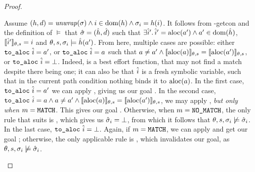 \begin{proof}
\begin{hypvlist}
 Assume $(h,d)={\operatorname{\mathit{unwrap}}}(\sigma) \land i\in\operatorname{dom}(h) \land \sigma_{i}=h(i)$.
 It follows from \hyp{getcon} and the definition of $\models$ that $\hat{\sigma}=(\hat{h}, \hat{d})$ such that $\exists \hat{i}'\ldotp \hat{i}' = \text{aloc}(a') \land a' \in \operatorname{dom}(\hat{h})$, $\llbracket\hat{i}'\rrbracket_{\theta,s}=i$ and $\theta,s,\sigma_i\models \hat{h}(a')$.
 From here, multiple cases are possible: either $\texttt{to\_aloc}~\hat{i}=a'$, or $\texttt{to\_aloc}~\hat{i}=a$ such that $a\neq a'\land \llbracket\text{aloc}(a)\rrbracket_{\theta,s}=\llbracket\text{aloc}(a')\rrbracket_{\theta,s}$, or $\texttt{to\_aloc}~\hat{i}=\bot$. Indeed,  is a best effort function, that may not find a match despite there being one; it can also be that $\hat{i}$ is a fresh symbolic variable, such that in the current path condition nothing binds it to $\text{aloc}(a)$.
 In the first case, $\texttt{to\_aloc}~\hat{i}=a'$ we can apply , giving us our goal .
 In the second case, $\texttt{to\_aloc}~\hat{i}=a\land a\neq a'\land \llbracket\text{aloc}(a)\rrbracket_{\theta,s}=\llbracket\text{aloc}(a')\rrbracket_{\theta,s}$, we may apply , \emph{but only when $m=\texttt{MATCH}$}. This gives our goal . {\color{red}Otherwise, when $m=\texttt{NO\_MATCH}$, the only rule that suits is , which gives us $\hat{\sigma}_i=\bot$, from which it follows that $\theta,s,\sigma_i\not\models\hat{\sigma}_i$.}
 In the last case, $\texttt{to\_aloc}~\hat{i}=\bot$. Again, if $m=\texttt{MATCH}$, we can apply  and get our goal ; {\color{red}otherwise, the only applicable rule is , which invalidates our goal, as $\theta,s,\sigma_i\not\models\hat{\sigma}_i$.}
\end{hypvlist}



\end{proof}
